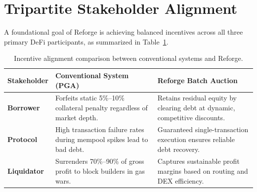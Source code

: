 \section{Tripartite Stakeholder Alignment}
A foundational goal of Reforge is achieving balanced incentives across all three primary DeFi participants, as summarized in Table~\ref{tab:tripartite_alignment}.

\begin{table}[htbp]
\centering
\caption{Incentive alignment comparison between conventional systems and Reforge.}
\label{tab:tripartite_alignment}
\begin{tabular}{p{2.5cm}|p{5.5cm}|p{6.0cm}}
\hline
\textbf{Stakeholder} & \textbf{Conventional System (PGA)} & \textbf{Reforge Batch Auction} \\
\hline
\textbf{Borrower} & Forfeits static 5\%--10\% collateral penalty regardless of market depth. & Retains residual equity by clearing debt at dynamic, competitive discounts. \\
\hline
\textbf{Protocol} & High transaction failure rates during mempool spikes lead to bad debt. & Guaranteed single-transaction execution ensures reliable debt recovery. \\
\hline
\textbf{Liquidator} & Surrenders 70\%--90\% of gross profit to block builders in gas wars. & Captures sustainable profit margins based on routing and DEX efficiency. \\
\hline
\end{tabular}
\end{table}
